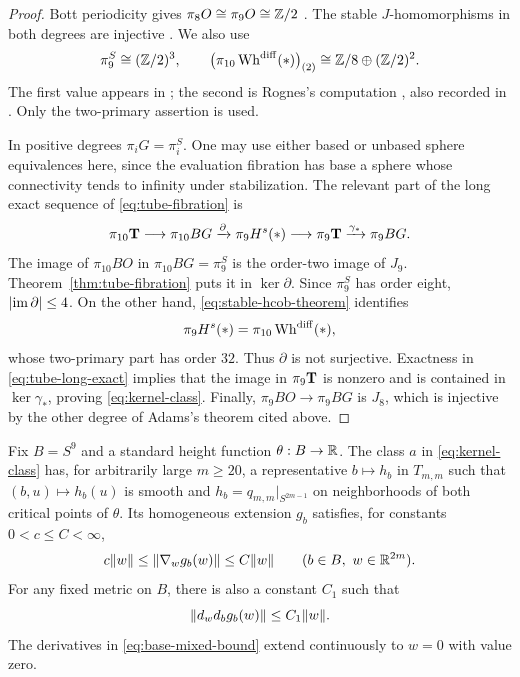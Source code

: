 \begin{proof}
Bott periodicity gives $\pi_8O\cong\pi_9O\cong\mathbb Z/2$
\cite[Corollary to Theorem~II, equation~(1.5)]{Bott1959}.
The stable $J$-homomorphisms in both degrees are injective
\cite[Theorem~9.5]{Adams1966}. We also use
\[
 \pi_9^S\cong(\mathbb Z/2)^3,
 \qquad
 \bigl(\pi_{10}\operatorname{Wh}^{\mathrm{diff}}(*)\bigr)_{(2)}
 \cong\mathbb Z/8\oplus(\mathbb Z/2)^2.
\]
The first value appears in \cite[Table~1, degree~9]{IWX2023}; the second
is Rognes's computation \cite[Theorem~5.8]{Rognes2002}, also recorded in
\cite[Theorem~3.3]{Rognes2014}. Only the two-primary assertion is used.

In positive degrees $\pi_iG=\pi_i^S$. One may use either based or
unbased sphere equivalences here, since the evaluation fibration has
base a sphere whose connectivity tends to infinity under stabilization.
The relevant part of the long exact sequence of
\eqref{eq:tube-fibration} is
\begin{equation}\label{eq:tube-long-exact}
 \pi_{10}\mathbf T\longrightarrow\pi_{10}BG
 \xrightarrow{\partial}\pi_9H^s(*)
 \longrightarrow\pi_9\mathbf T\xrightarrow{\gamma_*}\pi_9BG.
\end{equation}
The image of $\pi_{10}BO$ in $\pi_{10}BG=\pi_9^S$ is the
order-two image of $J_9$. Theorem~\ref{thm:tube-fibration} puts it in
$\ker\partial$. Since $\pi_9^S$ has order eight,
$\lvert\operatorname{im}\partial\rvert\leq4$. On the other hand,
\eqref{eq:stable-hcob-theorem} identifies
\[
 \pi_9H^s(*)=\pi_{10}\operatorname{Wh}^{\mathrm{diff}}(*),
\]
whose two-primary part has order $32$. Thus $\partial$ is not surjective.
Exactness in \eqref{eq:tube-long-exact} implies that the image in
$\pi_9\mathbf T$ is nonzero and is contained in $\ker\gamma_*$, proving
\eqref{eq:kernel-class}. Finally, $\pi_9BO\to\pi_9BG$ is $J_8$, which
is injective by the other degree of Adams's theorem cited above.
\end{proof}

\begin{lemma}\label{lem:localized-family}
Fix $B=S^9$ and a standard height function $\theta:B\to\mathbb R$. The class
$a$ in \eqref{eq:kernel-class} has, for arbitrarily large $m\geq20$,
a representative $b\mapsto h_b$ in $T_{m,m}$ such that
$(b,u)\mapsto h_b(u)$ is smooth and $h_b=q_{m,m}|_{S^{2m-1}}$ on
neighborhoods of both critical points of $\theta$. Its homogeneous
extension $g_b$ satisfies, for constants $0<c\leq C<\infty$,
\begin{equation}\label{eq:uniform-homogeneous-gradient}
 c\lVert w\rVert\leq\lVert\nabla_wg_b(w)\rVert\leq C\lVert w\rVert
 \qquad(b\in B,\ w\in\mathbb R^{2m}).
\end{equation}
For any fixed metric on $B$, there is also a constant $C_1$ such that
\begin{equation}\label{eq:base-mixed-bound}
 \lVert d_wd_bg_b(w)\rVert\leq C_1\lVert w\rVert.
\end{equation}
The derivatives in \eqref{eq:base-mixed-bound} extend continuously to
$w=0$ with value zero.
\end{lemma}

